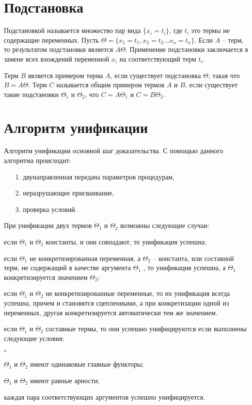 \section{Подстановка}
Подстановкой называется множество пар вида \(\{x_i = t_i\}\), где \(t_i\) это термы не содержащие переменных. Пусть \(\Theta=\{x_1 = t_1, x_2 = t_2 ... x_n = t_n\}\). Если \(A\) -- терм, то результатом подстановки является \(A\Theta\). Применение подстановки заключается в замене всех вхождений переменной \(x_i\) на соответствующий терм \(t_i\). 

Терм \(B\) является примером терма \(A\), если существует подстановка \(\Theta\), такая что \(B=A\Theta\). Терм \(C\) называется общим примером термов \(A\) и \(B\), если существует такие подстановки \(\Theta_1\) и \(\Theta_2 \), что \(C=A\Theta_1 \) и \(C=B\Theta_2 \).

\section{Алгоритм унификации}
Алгоритм унификации основной шаг доказательства. С помощью данного алгоритма происходит:
\begin{itemize}
	\item [1.] двунаправленная передача параметров процедурам,
	\item [2.] неразрушающее присваивание,
	\item [3.] проверка условий.
\end{itemize}

При унификации двух термов \(\Theta_1 \) и \(\Theta_2 \)  возможны следующие случаи:
\begin{list}{\textbullet }{}
	\item если \(\Theta_1 \) и \(\Theta_2 \) константы, и они совпадают, то унификация успешна;
	\item если \(\Theta_1 \)  не конкретизированная переменная, а \(\Theta_2 \) -- константа, или составной терм, не содержащий в качестве аргумента \(\Theta_1 \) , то унификация успешна, а \(\Theta_1 \)  конкретизируется значением \(\Theta_2 \);
	\item если \(\Theta_1 \)  и \(\Theta_2 \) не конкретизированные переменные, то их унификация всегда успешна, причем  и  становятся сцепленными, а при конкретизации одной из переменных, другая конкретизируется автоматически тем же значением.
	\item если \(\Theta_1 \)  и \(\Theta_2 \) составные термы, то они успешно унифицируются если выполнены следующие условия:
	\begin{list}{$\circ$ }{}
		\item \(\Theta_1 \)  и \(\Theta_2 \) имеют одинаковые главные функторы;
		\item \(\Theta_1 \)  и \(\Theta_2 \) имеют равные арности;
		\item каждая пара соответствующих аргументов успешно унифицируется. 
	\end{list}
\end{list}

